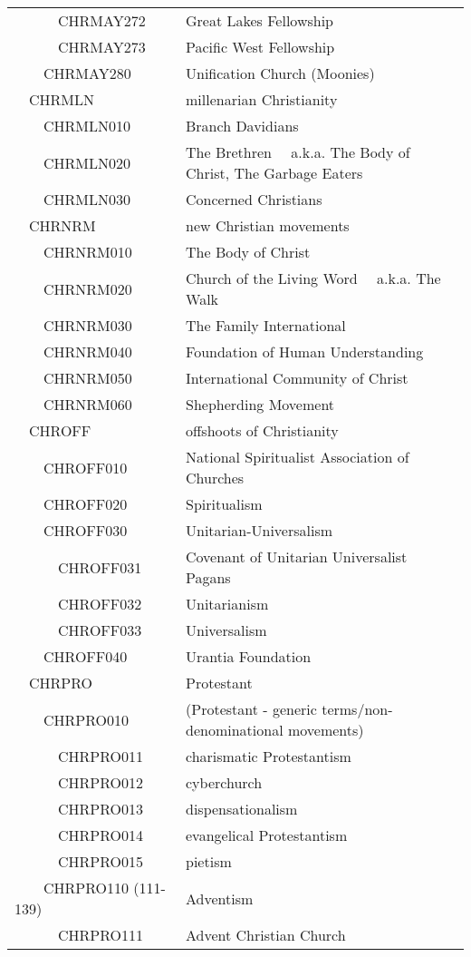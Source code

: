 \documentclass[12pt]{article}
\begin{document}
\begin{tiny}
\begin{center}
\begin{longtable}{|l|l|}
~~~~~~CHRMAY272 & Great Lakes Fellowship \\
~~~~~~CHRMAY273 & Pacific West Fellowship \\
~~~~CHRMAY280 & Unification Church (Moonies) \\
~~CHRMLN & millenarian Christianity \\
~~~~CHRMLN010 & Branch Davidians \\
~~~~CHRMLN020 & The Brethren	~~a.k.a. The Body of Christ, The Garbage Eaters \\
~~~~CHRMLN030 & Concerned Christians \\
~~CHRNRM & new Christian movements \\
~~~~CHRNRM010 & The Body of Christ \\
~~~~CHRNRM020 & Church of the Living Word	~~a.k.a. The Walk \\
~~~~CHRNRM030 & The Family International \\
~~~~CHRNRM040 & Foundation of Human Understanding \\
~~~~CHRNRM050 & International Community of Christ \\
~~~~CHRNRM060 & Shepherding Movement \\
~~CHROFF & offshoots of Christianity \\
~~~~CHROFF010 & National Spiritualist Association of Churches \\
~~~~CHROFF020 & Spiritualism \\
~~~~CHROFF030 & Unitarian-Universalism \\
~~~~~~CHROFF031 & Covenant of Unitarian Universalist Pagans \\
~~~~~~CHROFF032 & Unitarianism \\
~~~~~~CHROFF033 & Universalism \\
~~~~CHROFF040 & Urantia Foundation \\
~~CHRPRO & Protestant \\
~~~~CHRPRO010 & (Protestant - generic terms/non-denominational movements) \\
~~~~~~CHRPRO011 & charismatic Protestantism \\
~~~~~~CHRPRO012 & cyberchurch \\
~~~~~~CHRPRO013 & dispensationalism \\
~~~~~~CHRPRO014 & evangelical Protestantism \\
~~~~~~CHRPRO015 & pietism \\
~~~~CHRPRO110 (111-139) & Adventism \\
~~~~~~CHRPRO111 & Advent Christian Church \\

\end{longtable}
\end{center}
\end{tiny}
\end{document}
